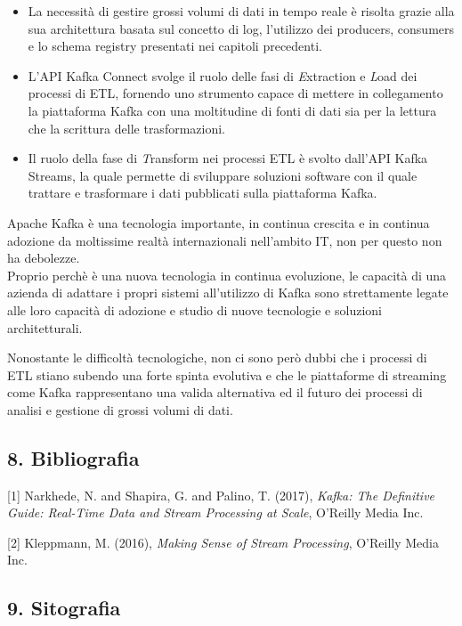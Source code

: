 \documentclass[]{article}
\providecommand{\tightlist}{%
  \setlength{\itemsep}{0pt}\setlength{\parskip}{0pt}}
\begin{document}
\begin{itemize}
\tightlist
\item
  La necessità di gestire grossi volumi di dati in tempo reale è risolta
  grazie alla sua architettura basata sul concetto di log, l'utilizzo
  dei producers, consumers e lo schema registry presentati nei capitoli
  precedenti.
\item
  L'API Kafka Connect svolge il ruolo delle fasi di \emph{E}xtraction e
  \emph{L}oad dei processi di ETL, fornendo uno strumento capace di
  mettere in collegamento la piattaforma Kafka con una moltitudine di
  fonti di dati sia per la lettura che la scrittura delle
  trasformazioni.
\item
  Il ruolo della fase di \emph{T}ransform nei processi ETL è svolto
  dall'API Kafka Streams, la quale permette di sviluppare soluzioni
  software con il quale trattare e trasformare i dati pubblicati sulla
  piattaforma Kafka.
\end{itemize}

Apache Kafka è una tecnologia importante, in continua crescita e in
continua adozione da moltissime realtà internazionali nell'ambito IT,
non per questo non ha debolezze.\\
Proprio perchè è una nuova tecnologia in continua evoluzione, le
capacità di una azienda di adattare i propri sistemi all'utilizzo di
Kafka sono strettamente legate alle loro capacità di adozione e studio
di nuove tecnologie e soluzioni architetturali.

Nonostante le difficoltà tecnologiche, non ci sono però dubbi che i
processi di ETL stiano subendo una forte spinta evolutiva e che le
piattaforme di streaming come Kafka rappresentano una valida alternativa
ed il futuro dei processi di analisi e gestione di grossi volumi di
dati.

\newpage

\hypertarget{bibliografia}{\subsection{8.
Bibliografia}\label{bibliografia}}

\small
[1] Narkhede, N. and Shapira, G. and Palino, T. (2017), \emph{Kafka: The
Definitive Guide: Real-Time Data and Stream Processing at Scale},
O'Reilly Media Inc.

{[}2{]} Kleppmann, M. (2016), \emph{Making Sense of Stream Processing},
O'Reilly Media Inc.

\hypertarget{sitografia}{\subsection{9. Sitografia}\label{sitografia}}
\end{document}
